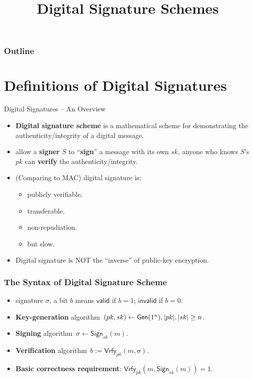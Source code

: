 

\title{Digital Signature Schemes}


\maketitle
\begin{frame}
\frametitle{Outline}
\tableofcontents
\end{frame}
\section{Definitions of Digital Signatures}
\begin{frame}{Digital Signatures -- An Overview}
\begin{itemize}
\item \textbf{Digital signature scheme} is a mathematical scheme for demonstrating the authenticity/integrity of a digital message.
\item allow a \textbf{signer} $S$ to ``\textbf{sign}'' a message with its own $sk$, anyone who knows $S$'s $pk$ can \textbf{verify} the authenticity/integrity.
\item (Comparing to MAC) digital signature is:
\begin{itemize}
\item publicly verifiable.
\item transferable.
\item non-repudiation.
\item but slow.
\end{itemize}
\item Digital signature is NOT the ``inverse'' of public-key encryption.
\end{itemize}
\end{frame}
\begin{frame}\frametitle{The Syntax of Digital Signature Scheme}
\begin{figure}
\begin{center}

\end{center}
\end{figure}
\begin{itemize}
\item signature $\sigma$, a bit $b$ means $\mathsf{valid}$ if $b=1$; $\mathsf{invalid}$ if $b=0$.
\item \textbf{Key-generation} algorithm~$(pk,sk) \gets \mathsf{Gen}(1^n), \lvert pk\rvert,\lvert sk\rvert \ge n$.
\item \textbf{Signing} algorithm~$\sigma \gets \mathsf{Sign}_{sk}(m)$.
\item \textbf{Verification} algorithm~$b:= \mathsf{Vrfy}_{pk}(m,\sigma)$.
\item \textbf{Basic correctness requirement}: $\mathsf{Vrfy}_{pk}(m,\mathsf{Sign}_{sk}(m)) = 1$.
\end{itemize}
\end{frame}
